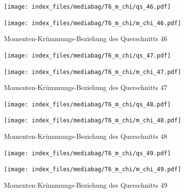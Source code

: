 \documentclass[
  11pt,
  letterpaper,
]{scrreprt}
\begin{document}
\begin{figure}[H]

\begin{minipage}{0.50\linewidth}
\texttt{[image: index\_files/mediabag/T6\_m\_chi/qs\_46.pdf]}\end{minipage}%
%
\begin{minipage}{0.50\linewidth}
\texttt{[image: index\_files/mediabag/T6\_m\_chi/m\_chi\_46.pdf]}\end{minipage}%

\caption{\label{fig-mchi_anhang}Momenten-Krümmungs-Beziehung des
Querschnitts 46}

\end{figure}%

\begin{figure}[H]

\begin{minipage}{0.50\linewidth}
\texttt{[image: index\_files/mediabag/T6\_m\_chi/qs\_47.pdf]}\end{minipage}%
%
\begin{minipage}{0.50\linewidth}
\texttt{[image: index\_files/mediabag/T6\_m\_chi/m\_chi\_47.pdf]}\end{minipage}%

\caption{\label{fig-mchi_anhang}Momenten-Krümmungs-Beziehung des
Querschnitts 47}

\end{figure}%

\begin{figure}[H]

\begin{minipage}{0.50\linewidth}
\texttt{[image: index\_files/mediabag/T6\_m\_chi/qs\_48.pdf]}\end{minipage}%
%
\begin{minipage}{0.50\linewidth}
\texttt{[image: index\_files/mediabag/T6\_m\_chi/m\_chi\_48.pdf]}\end{minipage}%

\caption{\label{fig-mchi_anhang}Momenten-Krümmungs-Beziehung des
Querschnitts 48}

\end{figure}%

\begin{figure}[H]

\begin{minipage}{0.50\linewidth}
\texttt{[image: index\_files/mediabag/T6\_m\_chi/qs\_49.pdf]}\end{minipage}%
%
\begin{minipage}{0.50\linewidth}
\texttt{[image: index\_files/mediabag/T6\_m\_chi/m\_chi\_49.pdf]}\end{minipage}%

\caption{\label{fig-mchi_anhang}Momenten-Krümmungs-Beziehung des
Querschnitts 49}

\end{figure}%
\end{document}
